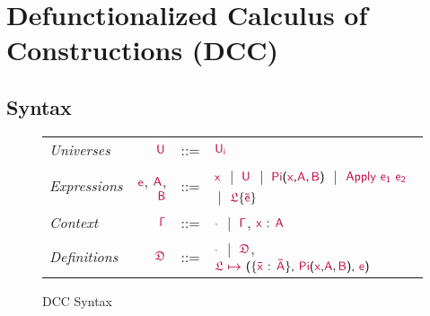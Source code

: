 
\section{Defunctionalized Calculus of Constructions (DCC)}

\subsection{Syntax}

\begin{figure}
	\renewcommand{\arraystretch}{1.3}
	\begin{tabular}{l r l l}
		\textit{Universes}   & $\target{U} $       & ::= & $\target{U_i}$ \\
		\textit{Expressions} & $\target{e}$, $\target{A}$, $\target{B}$  & ::= & 
			$\target{x}$ $\ |\ $ $\target{U}$ $\ |\ $ $\targetpi{x}{A}{B}$ $\ |\ $ $\targetapp{e_1}{e_2}$ $\ |\ $ $\targetlab{\flabel}{\bar{e}}$\\
		\textit{Context} & $\target{\Gamma}$ & ::= & $\target{\cdot}$ $\ |\ $ $\target{\Gamma}$, $\itemtype{x}{A}$ \\
		\textit{Definitions} & $\target{\fdef}$ & ::= & $\target{\cdot}$ $\ |\ $ 
			$\target{\fdef}$, $\itemdef{\target{\flabel}}{\itemtype{\bar{x}}{\bar{A}}}{\targetpi{x}{A}{B}}{\target{e}}$
	\end{tabular}

	\caption{DCC Syntax}
    \label{fig:dcc syntax}
\end{figure}

